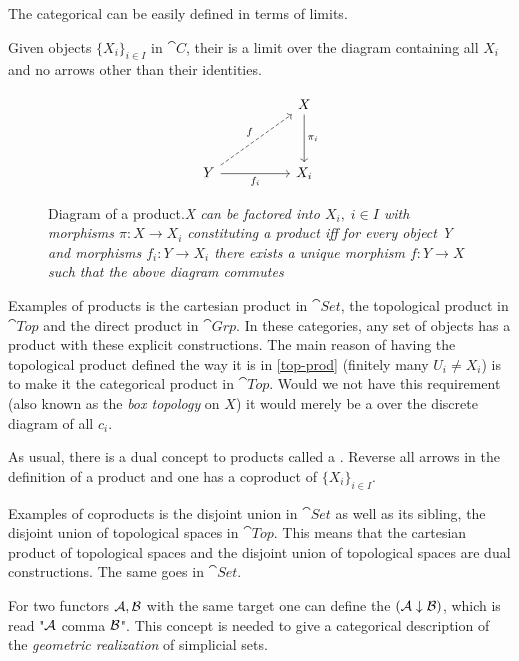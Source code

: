 \documentclass[../../main.tex]{subfiles}
\begin{document}
    The categorical  can be easily defined in terms of limits. 
    
    \begin{definition}
        Given objects $\{X_i\}_{i \in I}$ in $\cat{C}$, their  is a limit over the diagram containing all $X_i$ and no arrows other than their identities.
    \end{definition}

    \begin{figure}[H]
        \[
            \begin{tikzcd}[row sep = 8ex, column sep = 5em]
                & X \arrow[d, "\pi_i"] \\
                Y \arrow[ru,"f",dashed] \arrow[r,"f_i",swap] & X_i  
              \end{tikzcd}
        \]
        \caption{Diagram of a product.\textit{X can be factored into $X_i,\; i \in I$ with morphisms $\pi:X\to X_i$ constituting a product iff for every object Y and morphisms $f_i:Y\to X_i$ there exists a unique morphism $f:Y\to X$ such that the above diagram commutes}}
        \label{fig:product}
    \end{figure}
    
    Examples of products is the cartesian product in $\cat{Set}$, the topological product in $\cat{Top}$ and the direct product in $\cat{Grp}$. In these categories, any set of objects has a product with these explicit constructions. The main reason of having the topological product defined the way it is in \ref{top-prod} (finitely many $U_i \neq X_i$) is to make it the categorical product in $\cat{Top}$. Would we not have this requirement (also known as the \emph{box topology} on $X$) it would merely be a  over the discrete diagram of all $c_i$.
    
    As usual, there is a dual concept to products called a . Reverse all arrows in the definition of a product and one has a coproduct of $\{X_i\}_{i\in I}$.

    Examples of coproducts is the disjoint union in $\cat{Set}$ as well as its sibling, the disjoint union of topological spaces in $\cat{Top}$. This means that the cartesian product of topological spaces and the disjoint union of topological spaces are dual constructions. The same goes in $\cat{Set}$.

    For two functors $\mathcal{A}, \mathcal{B}$ with the same target one can define the  $(\mathcal{A} \downarrow \mathcal{B})$, which is read "$\mathcal{A}$ comma $\mathcal{B}$". This concept is needed to give a categorical description of the \textit{geometric realization} of simplicial sets.
\end{document}
